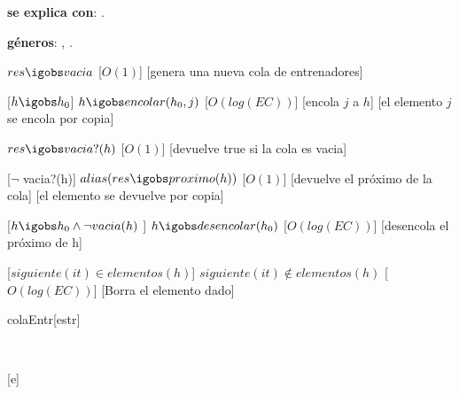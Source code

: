 \begin{Interfaz}

  \textbf{se explica con}: .

  \textbf{g\'eneros}: , .



  {$res \igobs vacia$}%
  [$O(1)$]
  [genera una nueva cola de entrenadores]


  [$h \igobs h_{0}$]
  {$h \igobs encolar(h_{0}, j)$}
  [$O(log(EC))$]
  [encola $j$ a $h$]
  [el elemento $j$ se encola por copia]

  {$res \igobs vacia?(h)$}
  [$O(1)$]
  [devuelve true si la cola es vacia]


  [$\neg$ vacia?(h)]  
  {$alias(res \igobs proximo(h))$} 
  [$O(1)$]
  [devuelve el pr\'oximo de la cola]
  [el elemento se devuelve por copia]
  
  
  [$h \igobs h_{0} \land \neg vacia(h)$ ]  
  {$h \igobs desencolar(h_{0})$} 
  [$O(log(EC))$]
  [desencola el pr\'oximo de h]
 


 
  [$siguiente(it) \in elementos(h)$]
  {$siguiente(it) \not\in elementos(h)$}
  [$O(log(EC))$]
  [Borra el elemento dado]
  
\end{Interfaz}

\begin{Representacion}
 
  \begin{Estructura}{colaEntr}[estr]
      \begin{Tupla}[estr]%
    \end{Tupla}
  \end{Estructura}

	\begin{Tupla}[Nodoheap]
	\end{Tupla}

	\begin{Tupla}[entrenador]
	\end{Tupla}



  ~

  [e]{}

\end{Representacion}

